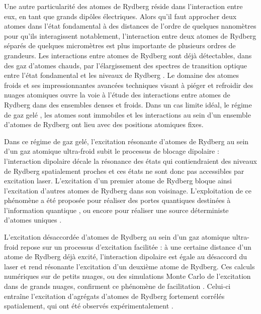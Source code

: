 Une autre particularité des atomes de Rydberg réside dans l'interaction entre eux, en tant que grands dipôles électriques.
Alors qu'il faut approcher deux atomes dans l'état fondamental à des distances de l'ordre de quelques nanomètres pour qu'ils interagissent notablement, l'interaction entre deux atomes de Rydberg séparés de quelques micromètres est plus importante de plusieurs ordres de grandeurs.
Les interactions entre atomes de Rydberg sont déjà détectables, dans des gaz d'atomes chauds, par l'élargissement des spectres de transition optique entre l'état fondamental et les niveaux de Rydberg \cite{ENS_DENSEGAS,ENS_LASERSPEC5SP}.
Le domaine des atomes froids et ses impressionnantes avancées techniques visant à piéger et refroidir des nuages atomiques \cite{Pritchard1983,Dalibard1983,Dalibard1984,Chu1986,CCT1990} ouvre la voie à l'étude des interactions entre atomes de Rydberg dans des ensembles denses et froids.
Dans un cas limite idéal, le régime de \og gaz gelé \fg{} \cite{Gallagher1998,Pillet1998}, les atomes sont immobiles et les interactions au sein d'un ensemble d'atomes de Rydberg ont lieu avec des positions atomiques fixes.


Dans ce régime de gaz gelé, l'excitation résonante d'atomes de Rydberg au sein d'un gaz atomique ultra-froid subit le processus de \og blocage dipolaire \fg{} \cite{Lukin2001} :
l'interaction dipolaire décale la résonance des états qui contiendraient des niveaux de Rydberg spatialement proches et ces états ne sont donc pas accessibles par excitation laser.
L'excitation d'un premier atome de Rydberg bloque ainsi l'excitation d'autres atomes de Rydberg dans son voisinage.
L'exploitation de ce phénomène a été proposée pour réaliser des portes quantiques destinées à l'information quantique \cite{Lukin2001,Lukin2000b,Saffman2010}, ou encore pour réaliser une source déterministe d'atomes uniques \cite{Saffman2002}.

L'excitation désaccordée d'atomes de Rydberg au sein d'un gaz atomique ultra-froid repose sur un processus d'\og excitation facilitée \fg{} :
à une certaine distance d'un atome de Rydberg déjà excité, l'interaction dipolaire est égale au désaccord du laser et rend résonante l'excitation d'un deuxième atome de Rydberg.
Ces calculs numériques sur de petits nuages, ou des simulations Monte Carlo de l'excitation dans de grands nuages, confirment ce phénomène de facilitation \cite{Robicheaux2005,Rost2007a,Evers2013,Cote2010}.
Celui-ci entraîne l'excitation d'agrégats d'atomes de Rydberg fortement corrélés spatialement, qui ont été observés expérimentalement \cite{Weidemueller2013,Pillet2012}.

